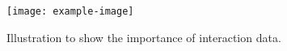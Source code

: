 
\begin{figure}[ht]
    \centering
    \texttt{[image: example-image]}
    \caption{\small Illustration to show the importance of interaction data.}
    \label{fig:intent_corner}
\end{figure}